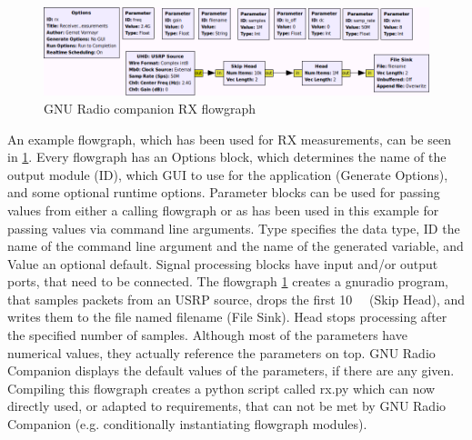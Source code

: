 \documentclass[12pt,a4paper,parskip=full]{scrartcl}
\begin{document}
\begin{figure}[htb]
    \centering
    \includegraphics[width=\linewidth]{grc}
    \caption{GNU Radio companion RX flowgraph}
    \label{fig:grc_rx}
\end{figure}
An example flowgraph, which has been used for RX measurements, can be seen in \cref{fig:grc_rx}.
Every flowgraph has an {\ttfamily Options} block, which determines the name of the output module ({\ttfamily ID}),
which GUI to use for the application ({\ttfamily Generate Options}), and some optional runtime options.
{\ttfamily Parameter} blocks can be used for passing values from either a calling flowgraph or as has
been used in this example for passing values via command line arguments. {\ttfamily Type} specifies the
data type, {\ttfamily ID} the name of the command line argument and the name of the generated variable,
and {\ttfamily Value} an optional default. Signal processing blocks have input and/or output ports, that
need to be connected. The flowgraph \cref{fig:grc_rx} creates a gnuradio program, that samples
packets from an USRP source, drops the first \SI{10}{\kilo\samples} ({\ttfamily Skip Head}), and writes
them to the file named {\ttfamily filename} ({\ttfamily File Sink}). {\ttfamily Head} stops processing after the
specified number of samples. Although most of the parameters have numerical values, they actually
reference the parameters on top. GNU Radio Companion displays the default values of the parameters,
if there are any given. Compiling this flowgraph creates a python script called {\ttfamily rx.py} which
can now directly used, or adapted to requirements, that can not be met by GNU Radio Companion (e.g.
conditionally instantiating flowgraph modules).
\end{document}
